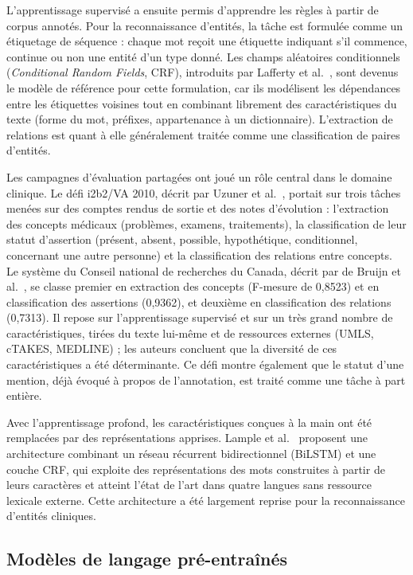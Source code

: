 L'apprentissage supervisé a ensuite permis d'apprendre les règles à partir de corpus annotés. Pour la reconnaissance d'entités, la tâche est formulée comme un étiquetage de séquence : chaque mot reçoit une étiquette indiquant s'il commence, continue ou non une entité d'un type donné. Les champs aléatoires conditionnels (\textit{Conditional Random Fields}, CRF), introduits par Lafferty et al.~\cite{lafferty2001crf}, sont devenus le modèle de référence pour cette formulation, car ils modélisent les dépendances entre les étiquettes voisines tout en combinant librement des caractéristiques du texte (forme du mot, préfixes, appartenance à un dictionnaire). L'extraction de relations est quant à elle généralement traitée comme une classification de paires d'entités.

Les campagnes d'évaluation partagées ont joué un rôle central dans le domaine clinique. Le défi i2b2/VA 2010, décrit par Uzuner et al.~\cite{uzuner2011i2b2}, portait sur trois tâches menées sur des comptes rendus de sortie et des notes d'évolution : l'extraction des concepts médicaux (problèmes, examens, traitements), la classification de leur statut d'assertion (présent, absent, possible, hypothétique, conditionnel, concernant une autre personne) et la classification des relations entre concepts. Le système du Conseil national de recherches du Canada, décrit par de Bruijn et al.~\cite{debruijn2011machine}, se classe premier en extraction des concepts (F-mesure de 0,8523) et en classification des assertions (0,9362), et deuxième en classification des relations (0,7313). Il repose sur l'apprentissage supervisé et sur un très grand nombre de caractéristiques, tirées du texte lui-même et de ressources externes (UMLS, cTAKES, MEDLINE) ; les auteurs concluent que la diversité de ces caractéristiques a été déterminante. Ce défi montre également que le statut d'une mention, déjà évoqué à propos de l'annotation, est traité comme une tâche à part entière.

Avec l'apprentissage profond, les caractéristiques conçues à la main ont été remplacées par des représentations apprises. Lample et al.~\cite{lample2016neural} proposent une architecture combinant un réseau récurrent bidirectionnel (BiLSTM) et une couche CRF, qui exploite des représentations des mots construites à partir de leurs caractères et atteint l'état de l'art dans quatre langues sans ressource lexicale externe. Cette architecture a été largement reprise pour la reconnaissance d'entités cliniques.

\subsection{Modèles de langage pré-entraînés}

